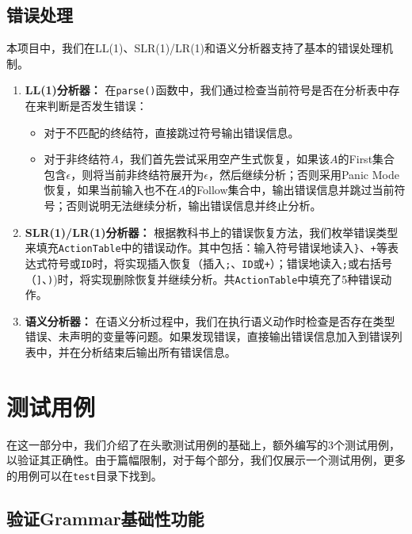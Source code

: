 \documentclass[UTF8,openany]{ctexbook}
\begin{document}
\section{错误处理}

本项目中，我们在LL(1)、SLR(1)/LR(1)和语义分析器支持了基本的错误处理机制。

\begin{enumerate}[noitemsep,topsep=0pt,partopsep=0pt]
    \item \textbf{LL(1)分析器：} 在\texttt{parse()}函数中，我们通过检查当前符号是否在分析表中存在来判断是否发生错误：
    \begin{itemize}[noitemsep,topsep=0pt,partopsep=0pt]
        \item 对于不匹配的终结符，直接跳过符号输出错误信息。
        \item 对于非终结符$A$，我们首先尝试采用空产生式恢复，如果该$A$的First集合包含$\epsilon$，则将当前非终结符展开为$\epsilon$，然后继续分析；否则采用Panic Mode恢复，如果当前输入也不在$A$的Follow集合中，输出错误信息并跳过当前符号；否则说明无法继续分析，输出错误信息并终止分析。
    \end{itemize}
    \item \textbf{SLR(1)/LR(1)分析器：} 根据教科书上的错误恢复方法，我们枚举错误类型来填充\texttt{ActionTable}中的错误动作。其中包括：输入符号错误地读入\texttt{\}}、\texttt{+}等表达式符号或\texttt{ID}时，将实现插入恢复（插入\texttt{;}、\texttt{ID}或\texttt{+}）；错误地读入\texttt{;}或右括号（\texttt{]}、\texttt{)})时，将实现删除恢复并继续分析。共\texttt{ActionTable}中填充了5种错误动作。
    \item \textbf{语义分析器：} 在语义分析过程中，我们在执行语义动作时检查是否存在类型错误、未声明的变量等问题。如果发现错误，直接输出错误信息加入到错误列表中，并在分析结束后输出所有错误信息。
    
\end{enumerate}

\chapter{测试用例}
\label{sec:test}

在这一部分中，我们介绍了在头歌测试用例的基础上，额外编写的3个测试用例，以验证其正确性。由于篇幅限制，对于每个部分，我们仅展示一个测试用例，更多的用例可以在\texttt{test}目录下找到。

\section{验证Grammar基础性功能}
\label{sec:test_grammar}
\end{document}
